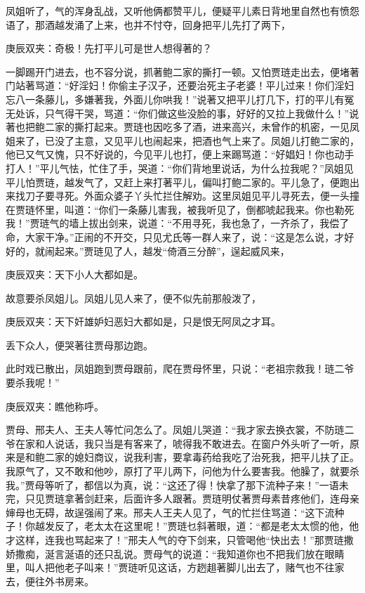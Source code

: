 \begin{parag}
    凤姐听了，气的浑身乱战，又听他俩都赞平儿，便疑平儿素日背地里自然也有愤怨语了，那酒越发涌了上来，也并不忖夺，回身把平儿先打了两下，\begin{note}庚辰双夹：奇极！先打平儿可是世人想得著的？\end{note}一脚踢开门进去，也不容分说，抓著鲍二家的撕打一顿。又怕贾琏走出去，便堵著门站著骂道：“好淫妇！你偷主子汉子，还要治死主子老婆！平儿过来！你们淫妇忘八一条藤儿，多嫌著我，外面儿你哄我！”说著又把平儿打几下，打的平儿有冤无处诉，只气得干哭，骂道：“你们做这些没脸的事，好好的又拉上我做什么！”说著也把鲍二家的撕打起来。贾琏也因吃多了酒，进来高兴，未曾作的机密，一见凤姐来了，已没了主意，又见平儿也闹起来，把酒也气上来了。凤姐儿打鲍二家的，他已又气又愧，只不好说的，今见平儿也打，便上来踢骂道：“好娼妇！你也动手打人！”平儿气怯，忙住了手，哭道：“你们背地里说话，为什么拉我呢？”凤姐见平儿怕贾琏，越发气了，又赶上来打著平儿，偏叫打鲍二家的。平儿急了，便跑出来找刀子要寻死。外面众婆子丫头忙拦住解劝。这里凤姐见平儿寻死去，便一头撞在贾琏怀里，叫道：“你们一条藤儿害我，被我听见了，倒都唬起我来。你也勒死我！”贾琏气的墙上拔出剑来，说道：“不用寻死，我也急了，一齐杀了，我偿了命，大家干净。”正闹的不开交，只见尤氏等一群人来了，说：“这是怎么说，才好好的，就闹起来。”贾琏见了人，越发“倚酒三分醉”，逞起威风来，\begin{note}庚辰双夹：天下小人大都如是。\end{note}故意要杀凤姐儿。凤姐儿见人来了，便不似先前那般泼了，\begin{note}庚辰双夹：天下奸雄妒妇恶妇大都如是，只是恨无阿凤之才耳。\end{note}丢下众人，便哭著往贾母那边跑。
\end{parag}


\begin{parag}
    此时戏已散出，凤姐跑到贾母跟前，爬在贾母怀里，只说：“老祖宗救我！琏二爷要杀我呢！”\begin{note}庚辰双夹：瞧他称呼。\end{note}贾母、邢夫人、王夫人等忙问怎么了。凤姐儿哭道：“我才家去换衣裳，不防琏二爷在家和人说话，我只当是有客来了，唬得我不敢进去。在窗户外头听了一听，原来是和鲍二家的媳妇商议，说我利害，要拿毒药给我吃了治死我，把平儿扶了正。我原气了，又不敢和他吵，原打了平儿两下，问他为什么要害我。他臊了，就要杀我。”贾母等听了，都信以为真，说：“这还了得！快拿了那下流种子来！”一语未完，只见贾琏拿著剑赶来，后面许多人跟著。贾琏明仗著贾母素昔疼他们，连母亲婶母也无碍，故逞强闹了来。邢夫人王夫人见了，气的忙拦住骂道：“这下流种子！你越发反了，老太太在这里呢！”贾琏乜斜著眼，道：“都是老太太惯的他，他才这样，连我也骂起来了！”邢夫人气的夺下剑来，只管喝他“快出去！”那贾琏撒娇撒痴，涎言涎语的还只乱说。贾母气的说道：“我知道你也不把我们放在眼睛里，叫人把他老子叫来！”贾琏听见这话，方趔趄著脚儿出去了，赌气也不往家去，便往外书房来。
\end{parag}


